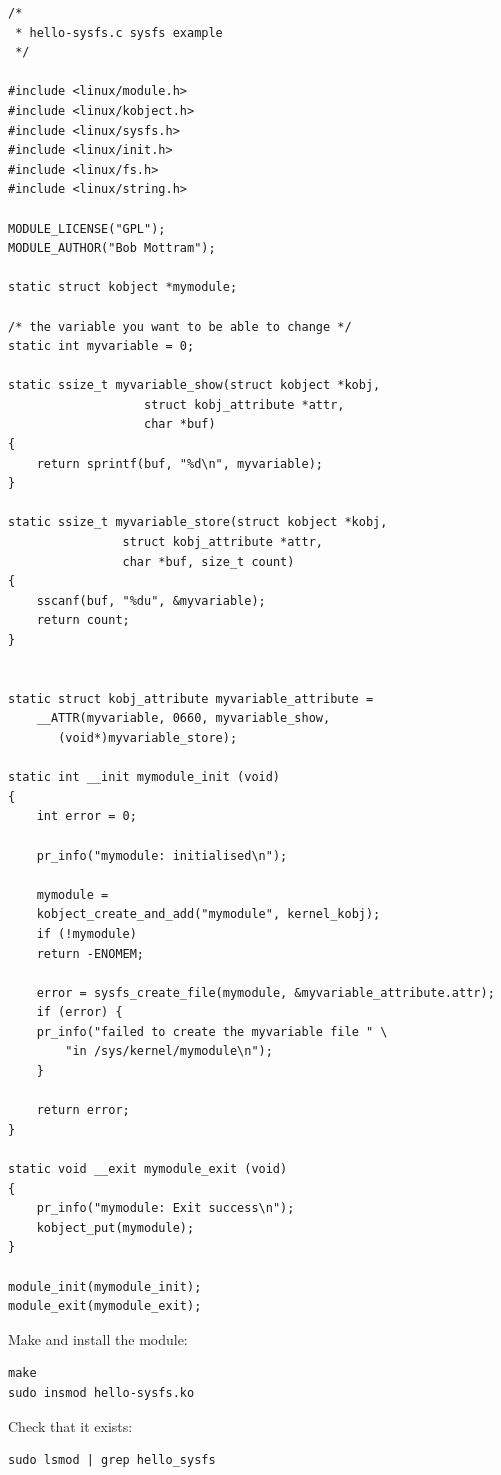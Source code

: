 \documentclass[11pt]{article}
\begin{document}
\begin{verbatim}
/*
 * hello-sysfs.c sysfs example
 */

#include <linux/module.h>
#include <linux/kobject.h>
#include <linux/sysfs.h>
#include <linux/init.h>
#include <linux/fs.h>
#include <linux/string.h>

MODULE_LICENSE("GPL");
MODULE_AUTHOR("Bob Mottram");

static struct kobject *mymodule;

/* the variable you want to be able to change */
static int myvariable = 0;

static ssize_t myvariable_show(struct kobject *kobj,
			       struct kobj_attribute *attr,
			       char *buf)
{
    return sprintf(buf, "%d\n", myvariable);
}

static ssize_t myvariable_store(struct kobject *kobj,
				struct kobj_attribute *attr,
				char *buf, size_t count)
{
    sscanf(buf, "%du", &myvariable);
    return count;
}


static struct kobj_attribute myvariable_attribute =
    __ATTR(myvariable, 0660, myvariable_show,
	   (void*)myvariable_store);

static int __init mymodule_init (void)
{
    int error = 0;

    pr_info("mymodule: initialised\n");

    mymodule =
	kobject_create_and_add("mymodule", kernel_kobj);
    if (!mymodule)
	return -ENOMEM;

    error = sysfs_create_file(mymodule, &myvariable_attribute.attr);
    if (error) {
	pr_info("failed to create the myvariable file " \
		"in /sys/kernel/mymodule\n");
    }

    return error;
}

static void __exit mymodule_exit (void)
{
    pr_info("mymodule: Exit success\n");
    kobject_put(mymodule);
}

module_init(mymodule_init);
module_exit(mymodule_exit);
\end{verbatim}

Make and install the module:

\begin{verbatim}
make
sudo insmod hello-sysfs.ko
\end{verbatim}

Check that it exists:

\begin{verbatim}
sudo lsmod | grep hello_sysfs
\end{verbatim}
\end{document}
